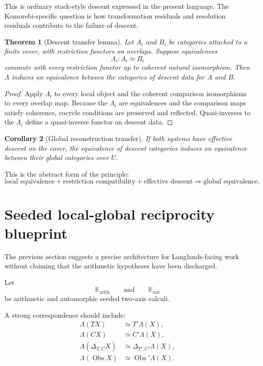 \documentclass[11pt]{article}
\newtheorem{theorem}{Theorem}[section]
\newtheorem{corollary}[theorem]{Corollary}
\theoremstyle{definition}
\theoremstyle{remark}
\newcommand{\Obs}{\operatorname{Obs}}
\begin{document}
This is ordinary stack-style descent expressed in the present language. The Komorebi-specific question is how transformation residuals and resolution residuals contribute to the failure of descent.

\begin{theorem}[Descent transfer lemma]\label{thm:descent-transfer}
Let $A_i$ and $B_i$ be categories attached to a finite cover, with restriction functors on overlaps. Suppose equivalences
\[
\Lambda_i:A_i\simeq B_i
\]
commute with every restriction functor up to coherent natural isomorphism. Then $\Lambda$ induces an equivalence between the categories of descent data for $A$ and $B$.
\end{theorem}

\begin{proof}
Apply $\Lambda_i$ to every local object and the coherent comparison isomorphisms to every overlap map. Because the $\Lambda_i$ are equivalences and the comparison maps satisfy coherence, cocycle conditions are preserved and reflected. Quasi-inverses to the $\Lambda_i$ define a quasi-inverse functor on descent data.
\end{proof}

\begin{corollary}[Global reconstruction transfer]\label{cor:global-transfer}
If both systems have effective descent on the cover, the equivalence of descent categories induces an equivalence between their global categories over $U$.
\end{corollary}

This is the abstract form of the principle:
\[
\boxed{
\text{local equivalence}
+
\text{restriction compatibility}
+
\text{effective descent}
\Longrightarrow
\text{global equivalence}.
}
\]

\section{Seeded local-global reciprocity blueprint}

The previous section suggests a precise architecture for Langlands-facing work without claiming that the arithmetic hypotheses have been discharged.

Let
\[
\mathbb K_{\mathrm{arith}}
\qquad\text{and}\qquad
\mathbb K_{\mathrm{aut}}
\]
be arithmetic and automorphic seeded two-axis calculi.

A strong correspondence should include:
\begin{align*}
\Lambda(TX)&\simeq T'\Lambda(X),\\
\Lambda(CX)&\simeq C'\Lambda(X),\\
\Lambda(\Delta_{T,C}X)&\simeq\Delta_{T',C'}\Lambda(X),\\
\Lambda(\Obs X)&\simeq\Obs'\Lambda(X).
\end{align*}
\end{document}
